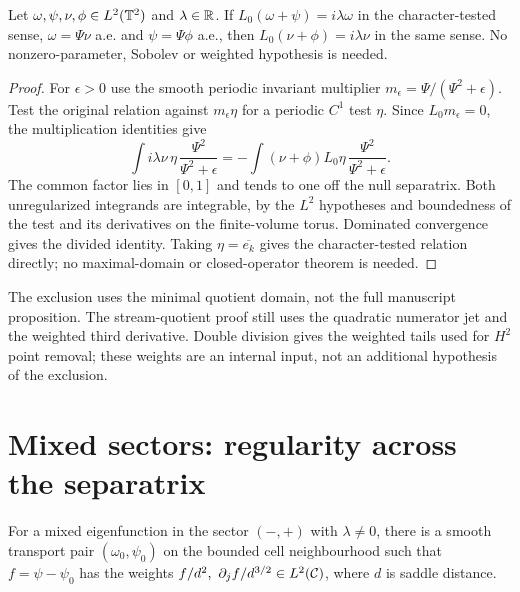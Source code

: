 \begin{corollary}
\label{cor:dd-quotient-transport-periodic}
\leanok
Let $\omega,\psi,\nu,\phi\in L^2(\mathbb{T}^2)$ and $\lambda\in\mathbb{R}$.
If $L_0(\omega+\psi)=i\lambda\omega$ in the character-tested sense,
$\omega=\Psi\nu$ a.e. and $\psi=\Psi\phi$ a.e., then
$L_0(\nu+\phi)=i\lambda\nu$ in the same sense.
No nonzero-parameter, Sobolev or weighted hypothesis is needed.
\end{corollary}

\begin{proof}
\leanok
For $\epsilon>0$ use the smooth periodic invariant multiplier
$m_\epsilon=\Psi/(\Psi^2+\epsilon)$.
Test the original relation against $m_\epsilon\eta$ for a periodic $C^1$
test $\eta$. Since $L_0m_\epsilon=0$, the multiplication identities give
\[
 \int i\lambda\nu\,\eta\,\frac{\Psi^2}{\Psi^2+\epsilon}
 =-\int(\nu+\phi)L_0\eta\,\frac{\Psi^2}{\Psi^2+\epsilon}.
\]
The common factor lies in $[0,1]$ and tends to one off the null separatrix.
Both unregularized integrands are integrable, by the $L^2$ hypotheses and
boundedness of the test and its derivatives on the finite-volume torus.
Dominated convergence gives the divided identity.
Taking $\eta=\overline{e_k}$ gives the character-tested relation directly;
no maximal-domain or closed-operator theorem is needed.
\end{proof}

\begin{remark}
The exclusion uses the minimal quotient domain, not the full manuscript
proposition. The stream-quotient proof still uses the quadratic numerator
jet and the weighted third derivative. Double division gives the weighted
tails used for $H^2$ point removal; these weights are an internal input,
not an additional hypothesis of the exclusion.
\end{remark}

\section{Mixed sectors: regularity across the separatrix}

\begin{lemma}
\label{lem:mixed-weighted-forcing-remainder}
\leanok
For a mixed eigenfunction in the sector $(-,+)$ with $\lambda\ne0$,
there is a smooth transport pair $(\omega_0,\psi_0)$ on the bounded
cell neighbourhood such that $f=\psi-\psi_0$ has the weights
$f/d^2,\ \partial_j f/d^{3/2}\in L^2(\mathcal{C})$, where $d$ is saddle distance.
\end{lemma}

